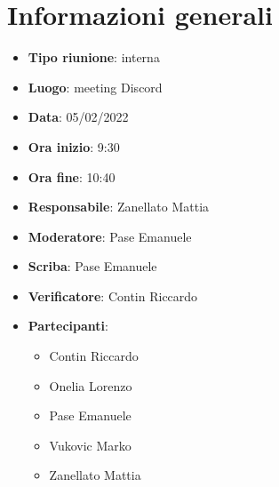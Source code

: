 \section{Informazioni generali}
\begin{itemize}
  \item \textbf{Tipo riunione}: interna
  \item \textbf{Luogo}: meeting Discord
  \item \textbf{Data}: 05/02/2022
  \item \textbf{Ora inizio}: 9:30
  \item \textbf{Ora fine}: 10:40
  \item \textbf{Responsabile}: Zanellato Mattia
  \item \textbf{Moderatore}: Pase Emanuele
  \item \textbf{Scriba}: Pase Emanuele
  \item \textbf{Verificatore}: Contin Riccardo
  \item \textbf{Partecipanti}:
  \begin{itemize}
    \item Contin Riccardo
    \item Onelia Lorenzo
    \item Pase Emanuele
    \item Vukovic Marko
    \item Zanellato Mattia
  \end{itemize}
\end{itemize}
